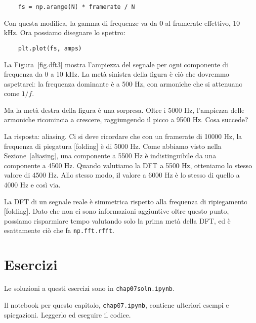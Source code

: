 \documentclass[12pt]{book} \usepackage[width=5.5in,height=8.5in, hmarginratio=3:2,vmarginratio=1:1]{geometry}
\begin{document}
\begin{verbatim} 
    fs = np.arange(N) * framerate / N
 \end{verbatim} 

Con questa modifica, la gamma di frequenze va da 0 al framerate effettivo, 10 kHz. Ora possiamo disegnare lo spettro:

\begin{verbatim} 
    plt.plot(fs, amps)
 \end{verbatim} 

La Figura~\ref{fig.dft3} mostra l'ampiezza del segnale per ogni componente di frequenza da 0 a 10 kHz. La metà sinistra della figura è ciò che dovremmo aspettarci: la frequenza dominante è a 500 Hz, con armoniche che si attenuano come $1/f$.

Ma la metà destra della figura è una sorpresa. Oltre i 5000 Hz, l'ampiezza delle armoniche ricomincia a crescere, raggiungendo il picco a 9500 Hz. Cosa succede?

La risposta: aliasing. Ci si deve ricordare che con un framerate di 10000 Hz, la frequenza di piegatura [folding] è di 5000 Hz. Come abbiamo visto nella Sezione~\ref{aliasing}, una componente a 5500 Hz è indistinguibile da una componente a 4500 Hz. Quando valutiamo la DFT a 5500 Hz, otteniamo lo stesso valore di 4500 Hz. Allo stesso modo, il valore a 6000 Hz è lo stesso di quello a 4000 Hz e così via.

La DFT di un segnale reale è simmetrica rispetto alla frequenza di ripiegamento [folding]. Dato che non ci sono informazioni aggiuntive oltre questo punto, possiamo risparmiare tempo valutando solo la prima metà della DFT, ed è esattamente ciò che fa {\tt np.fft.rfft}.

\section{Esercizi} 

Le soluzioni a questi esercizi sono in {\tt chap07soln.ipynb}.

\begin{exercise} Il notebook per questo capitolo, {\tt chap07.ipynb}, contiene ulteriori esempi e spiegazioni. Leggerlo ed eseguire il codice. \end{exercise} 
\end{document}
